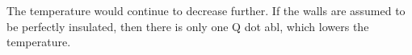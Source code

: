 The temperature would continue to decrease further. If the walls are assumed to be perfectly insulated, then there is only one Q dot abl, which lowers the temperature.